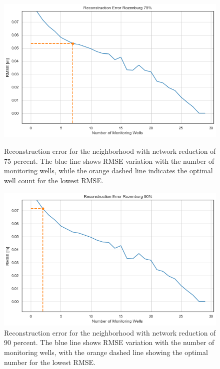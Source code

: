 \begin{figure}[htbp]
    \centering
    \begin{minipage}{0.48\textwidth}
        \includegraphics[width=\linewidth]{figures/res roz/roz75.png}
        \caption{Reconstruction error for the neighborhood with network reduction of 75 percent. The blue line shows RMSE variation with the number of monitoring wells, while the orange dashed line indicates the optimal well count for the lowest RMSE.}
        \label{fig:roz75}
    \end{minipage}\hfill
    \begin{minipage}{0.480\textwidth}
        \includegraphics[width=\linewidth]{figures/res roz/roz90.png}
        \caption{Reconstruction error for the neighborhood with network reduction of 90 percent. The blue line shows RMSE variation with the number of monitoring wells, with the orange dashed line showing the optimal number for the lowest RMSE.}
        \label{fig:roz90}
    \end{minipage}
\end{figure}

